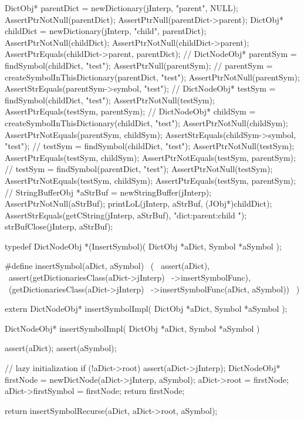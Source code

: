   DictObj* parentDict = newDictionary(jInterp, "parent", NULL);
  AssertPtrNotNull(parentDict);
  AssertPtrNull(parentDict->parent);
  DictObj* childDict  = newDictionary(jInterp, "child", parentDict);
  AssertPtrNotNull(childDict);
  AssertPtrNotNull(childDict->parent);
  AssertPtrEquals(childDict->parent, parentDict);
  //
  DictNodeObj* parentSym = findSymbol(childDict, "test");
  AssertPtrNull(parentSym);
  //
  parentSym = 
    createSymbolInThisDictionary(parentDict, "test");
  AssertPtrNotNull(parentSym);
  AssertStrEquals(parentSym->symbol, "test");
  //
  DictNodeObj* testSym = findSymbol(childDict, "test");
  AssertPtrNotNull(testSym);
  AssertPtrEquals(testSym, parentSym);
  //
  DictNodeObj* childSym =
    createSymbolInThisDictionary(childDict, "test");
  AssertPtrNotNull(childSym);
  AssertPtrNotEquals(parentSym, childSym);
  AssertStrEquals(childSym->symbol, "test");
  //
  testSym = findSymbol(childDict, "test");
  AssertPtrNotNull(testSym);
  AssertPtrEquals(testSym, childSym);
  AssertPtrNotEquals(testSym, parentSym);
  //
  testSym = findSymbol(parentDict, "test");
  AssertPtrNotNull(testSym);
  AssertPtrNotEquals(testSym, childSym);
  AssertPtrEquals(testSym, parentSym);
  //
  StringBufferObj *aStrBuf = newStringBuffer(jInterp);
  AssertPtrNotNull(aStrBuf);
  printLoL(jInterp, aStrBuf, (JObj*)childDict);
  AssertStrEquals(getCString(jInterp, aStrBuf), "dict:parent:child ");
  strBufClose(jInterp, aStrBuf);  
\stopCTest
\stopTestCase
\stopTestSuite

\startTestSuite[insertSymbol]

\startCHeader
typedef DictNodeObj *(InsertSymbol)(
  DictObj *aDict,
  Symbol  *aSymbol
);

#define insertSymbol(aDict, aSymbol)            \
  (                                             \
    assert(aDict),                              \
    assert(getDictionariesClass(aDict->jInterp) \
      ->insertSymbolFunc),                      \
    (getDictionariesClass(aDict->jInterp)       \
      ->insertSymbolFunc(aDict, aSymbol))       \
  )
\stopCHeader

\setCHeaderStream{private}
\startCHeader
extern DictNodeObj* insertSymbolImpl(
  DictObj *aDict,
  Symbol  *aSymbol
);
\stopCHeader
\setCHeaderStream{public}

\startCCode
DictNodeObj* insertSymbolImpl(
  DictObj *aDict,
  Symbol  *aSymbol
) {
  assert(aDict);
  assert(aSymbol);

  // lazy initialization
  if (!aDict->root) {
    assert(aDict->jInterp);
    DictNodeObj* firstNode = newDictNode(aDict->jInterp, aSymbol);
    aDict->root            = firstNode;
    aDict->firstSymbol     = firstNode;
    return firstNode;
  }

  return insertSymbolRecurse(aDict, aDict->root, aSymbol);
}
\stopCCode
\stopTestSuite

